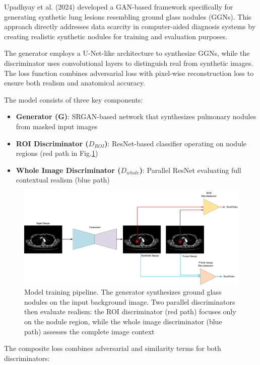 \documentclass{article}
\begin{document}
Upadhyay et al. (2024)\cite{wangGenerationSyntheticGround2022} developed a GAN-based framework specifically for generating synthetic lung lesions resembling ground glass nodules (GGNs). This approach directly addresses data scarcity in computer-aided diagnosis systems by creating realistic synthetic nodules for training and evaluation purposes.

The generator employs a U-Net-like architecture to synthesize GGNs\cite{8099502}, while the discriminator uses convolutional layers\cite{He2015DeepRL} to distinguish real from synthetic images. The loss function combines adversarial loss with pixel-wise reconstruction loss to ensure both realism and anatomical accuracy.

The model consists of three key components:
\begin{itemize}
\item \textbf{Generator (G)}: SRGAN-based network that synthesizes pulmonary nodules from masked input images
\item \textbf{ROI Discriminator ($D_{ROI}$)}: ResNet-based classifier operating on nodule regions (red path in Fig.\ref{fig:gan_architecture})
\item \textbf{Whole Image Discriminator ($D_{whole}$)}: Parallel ResNet evaluating full contextual realism (blue path)
\end{itemize}

\begin{figure}[htb]
    \centering
    \includegraphics[width=0.98\linewidth]{images/GAN_model.pdf}
    \caption{Model training pipeline. The generator synthesizes ground glass nodules on the input background image. Two parallel discriminators then evaluate realism: the ROI discriminator (red path) focuses only on the nodule region, while the whole image discriminator (blue path) assesses the complete image context}
    \label{fig:gan_architecture}
\end{figure}

The composite loss combines adversarial and similarity terms for both discriminators:
\end{document}
